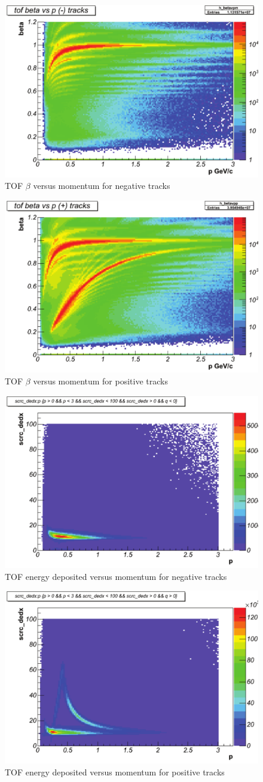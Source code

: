 \begin{figure}\begin{center}
    \includegraphics[width=.40\linewidth]{figures/calib/tof/Tof_56855_final_betavpm.pdf}
    \caption{TOF $\beta$ versus momentum for negative tracks}
    \label{plt:tofbetavpneg}
\end{center}\end{figure}

\begin{figure}\begin{center}
    \includegraphics[width=.40\linewidth]{figures/calib/tof/Tof_56855_final_betavpp.pdf}
    \caption{TOF $\beta$ versus momentum for positive tracks}
    \label{plt:tofbetavppos}
\end{center}\end{figure}

\begin{figure}\begin{center}
    \includegraphics[width=.40\linewidth]{figures/calib/tof/Tof_56855_final_dedxm.pdf}
    \caption{TOF energy deposited versus momentum for negative tracks}
    \label{plt:tofEvpneg}
\end{center}\end{figure}

\begin{figure}\begin{center}
    \includegraphics[width=.40\linewidth]{figures/calib/tof/Tof_56855_final_dedxp.pdf}
    \caption{TOF energy deposited versus momentum for positive tracks}
    \label{plt:tofEvppos}
\end{center}\end{figure}

